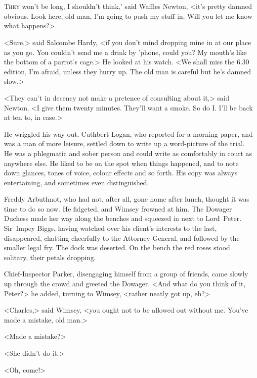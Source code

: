 \chapter[Chapter \thechapter]{}
\lettrine[ante=`]{T}{hey}  won't be long, I shouldn't think,' said Waffles Newton, <it's pretty damned obvious. Look here, old man, I'm going to push my stuff in. Will you let me know what happens?>

\zz
<Sure,> said Salcombe Hardy, <if you don't mind dropping mine in at our place as you go. You couldn't send me a drink by 'phone, could you? My mouth's like the bottom of a parrot's cage.> He looked at his watch. <We shall miss the 6.30 edition, I'm afraid, unless they hurry up. The old man is careful but he's damned slow.>

<They can't in decency not make a pretence of consulting about it,> said Newton. <I give them twenty minutes. They'll want a smoke. So do I\@. I'll be back at ten to, in case.>

He wriggled his way out. Cuthbert Logan, who reported for a morning paper, and was a man of more leisure, settled down to write up a word-picture of the trial. He was a phlegmatic and sober person and could write as comfortably in court as anywhere else. He liked to be on the spot when things happened, and to note down glances, tones of voice, colour effects and so forth. His copy was always entertaining, and sometimes even distinguished.

Freddy Arbuthnot, who had not, after all, gone home after lunch, thought it was time to do so now. He fidgeted, and Wimsey frowned at him. The Dowager Duchess made her way along the benches and squeezed in next to Lord~Peter. Sir~Impey Biggs, having watched over his client's interests to the last, disappeared, chatting cheerfully to the Attorney-General, and followed by the smaller legal fry. The dock was deserted. On the bench the red roses stood solitary, their petals dropping.

Chief-Inspector Parker, disengaging himself from a group of friends, came slowly up through the crowd and greeted the Dowager. <And what do you think of it, Peter?> he added, turning to Wimsey, <rather neatly got up, eh?>

<Charles,> said Wimsey, <you ought not to be allowed out without me. You've made a mistake, old man.>

<Made a mistake?>

<She didn't do it.>

<Oh, come!>

